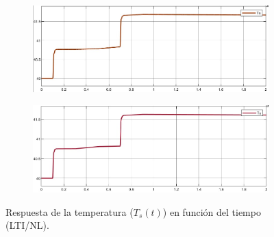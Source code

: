 \documentclass{article}
\begin{document}
\begin{figure}[H]
    \centering
    \begin{subfigure}[b]{0.8\textwidth}
        \includegraphics[width=\textwidth]{5.1.6_temperatura.jpg}
    \end{subfigure}
    \begin{subfigure}[b]{0.8\textwidth}
        \includegraphics[width=1\textwidth]{5.1.6_temperatura_NL.jpg}
    \end{subfigure}
    \caption{Respuesta de la temperatura ($T_s(t)$) en función del tiempo (LTI/NL).}
    \label{fig:temperatura} 
\end{figure}
\end{document}
